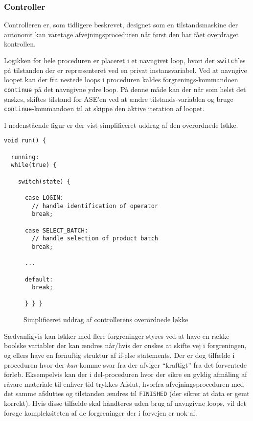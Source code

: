 \documentclass[a4paper]{article}
\begin{document}

\subsubsection{Controller} %

Controlleren er, som tidligere beskrevet, designet som en tilstandsmaskine der autonomt kan varetage  afvejningsproceduren når først den har fået overdraget kontrollen.

Logikken for hele proceduren er placeret i et navngivet loop, hvori der \texttt{switch}'es på tilstanden der er repræsenteret ved en privat instansvariabel. Ved at navngive loopet kan der fra nestede loops i proceduren kaldes forgrenings-kommandoen \texttt{continue} på det navngivne ydre loop. På denne måde kan der når som helst det ønskes, skiftes tilstand for ASE'en ved at ændre tilstands-variablen og bruge \texttt{continue}-kommandoen til at skippe den aktive iteration af loopet.

I nedenstående figur er der vist simplificeret uddrag af den overordnede løkke.

\begin{lstlisting}
void run() {

  running:
  while(true) {

    switch(state) {

      case LOGIN:
        // handle identification of operator
        break;

      case SELECT_BATCH:
        // handle selection of product batch
        break;

      ...

      default:
        break;

      } } }
\end{lstlisting}
\begin{figure}[h!]
  \caption{Simplificeret uddrag af controllerens overordnede løkke}
\end{figure}


Sædvanligvis kan løkker med flere forgreninger styres ved at have en række boolske variabler der kan ændres når/hvis der ønskes at skifte vej i forgreningen, og ellers have en fornuftig struktur af if-else statements. Der er dog tilfælde i proceduren hvor der \emph{kan} komme svar fra der afviger ``kraftigt'' fra det forventede forløb. Eksempelvis kan der i del-proceduren hvor der sikre en gyldig afmåling af råvare-materiale til enhver tid trykkes Afslut, hvorfra afvejningsproceduren med det samme afsluttes og tilstanden ændres til \texttt{FINISHED} (der sikrer at data er gemt korrekt). Hvis disse tilfælde skal håndteres uden brug af navngivne loops, vil det forøge kompleksiteten af de forgreninger der i forvejen er nok af.
\end{document}
